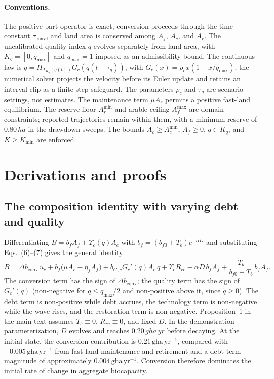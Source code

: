\documentclass[11pt,a4paper]{article}
\newcommand{\dconv}{\Delta b_{\mathrm{conv}}}
\newcommand{\Ups}{\Upsilon_c}
\newcommand{\Acmin}{A_c^{\min}}
\newcommand{\tconv}{\tau_{\mathrm{conv}}}
\begin{document}
\paragraph{Conventions.} The positive-part operator is exact, conversion proceeds through the time constant $\tconv$, and land area is conserved among $A_f$, $A_c$, and $A_r$. The uncalibrated quality index $q$ evolves separately from land area, with $K_q=[0,q_{\max}]$ and $q_{\max}=1$ imposed as an admissibility bound. The continuous law is $\dot q=\Pi_{T_{K_q}(q(t))}G_c(q(t-\tau_g))$, with $G_c(x)=\rho_cx(1-x/q_{\max})$; the numerical solver projects the velocity before its Euler update and retains an interval clip as a finite-step safeguard. The parameters $\rho_c$ and $\tau_g$ are scenario settings, not estimates. The maintenance term $\mu A_r$ permits a positive fast-land equilibrium. The reserve floor $A_r^{\min}$ and arable ceiling $A_f^{\max}$ are domain constraints; reported trajectories remain within them, with a minimum reserve of $0.80\,ha$ in the drawdown sweeps. The bounds $A_c\ge\Acmin$, $A_f\ge0$, $q\in K_q$, and $K\ge K_{\min}$ are enforced.

\section{Derivations and proofs}\label{si:proofs}

\subsection{The composition identity with varying debt and quality}\label{si:identity}

Differentiating $B=b_fA_f+\Ups(q)A_c$ with $b_f=(b_{f0}+T_b)e^{-\alpha D}$ and substituting Eqs.~(6)--(7) gives the general identity
\begin{equation}\label{eq:si_identity}
\dot B=\dconv\,u_c+b_f\big(\mu A_r-\eta_fA_f\big)+b_{G,c}G_c'(q)A_c\,\dot q+\Ups R_{rc}-\alpha\dot D\,b_fA_f+\frac{\dot T_b}{b_{f0}+T_b}\,b_fA_f .
\end{equation}
The conversion term has the sign of $\dconv$; the quality term has the sign of $G_c'(q)$ (non-negative for $q\le q_{\max}/2$ and non-positive above it, since $\dot q\ge0$). The debt term is non-positive while debt accrues, the technology term is non-negative while the wave rises, and the restoration term is non-negative. Proposition~1 in the main text assumes $T_b\equiv0$, $R_{rc}\equiv0$, and fixed $D$. In the demonstration parameterization, $D$ evolves and reaches $0.20\,gha\,yr$ before decaying. At the initial state, the conversion contribution is $0.21\,\mathrm{gha\,yr^{-1}}$, compared with $-0.005\,\mathrm{gha\,yr^{-1}}$ from fast-land maintenance and retirement and a debt-term magnitude of approximately $0.004\,\mathrm{gha\,yr^{-1}}$. Conversion therefore dominates the initial rate of change in aggregate biocapacity.
\end{document}
